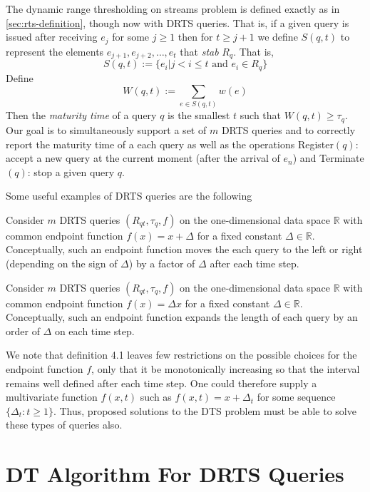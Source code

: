 The dynamic range thresholding on streams problem is defined exactly as in \cref{sec:rts-definition}, though now with DRTS queries. That is, if a given query is issued after receiving $e_j$ for some $j\geq 1$ then for $t\geq j+1$ we define $S(q,t)$ to represent the elements $e_{j+1},e_{j+2},\dots,e_t$ that \textit{stab} $R_q$. That is, 
$$S(q, t) := \{e_i | j < i \leq t \text{ and } e_i \in R_q\}$$
Define
$$W(q, t) := \sum_{e\in S(q,t)}w(e)$$
Then the \textit{maturity time} of a query $q$ is the smallest $t$ such that $W(q,t)\geq \tau_q$. Our goal is to simultaneously support a set of $m$ DRTS queries and to correctly report the maturity time of a each query as well as the operations Register$(q)$: accept a new query at the current moment (after the arrival of $e_n$) and Terminate$(q)$: stop a given query $q$.

Some useful examples of DRTS queries are the following

\begin{example} Consider $m$ DRTS queries $(R_{qt}, \tau_q, f)$ on the one-dimensional data space  $\mathbb{R}$ with common endpoint function $f(x) = x + \Delta$ for a fixed constant $\Delta\in\mathbb{R}$. Conceptually, such an endpoint function moves the each query to the left or right (depending on the sign of $\Delta$) by a factor of $\Delta$ after each time step.
\end{example}

\begin{example} Consider $m$ DRTS queries $(R_{qt}, \tau_q, f)$ on the one-dimensional data space  $\mathbb{R}$ with common endpoint function $f(x) = \Delta x$  for a fixed constant $\Delta\in\mathbb{R}$. Conceptually, such an endpoint function expands the length of each query by an order of $\Delta$ on each time step.
\end{example}
    
We note that definition 4.1 leaves few restrictions on the possible choices for the endpoint function $f$, only that it be monotonically increasing so that the interval remains well defined after each time step. One could therefore supply a multivariate function $f(x,t)$ such as $f(x, t) = x + \Delta_t$ for some sequence $\{\Delta_t: t\geq1\}$. Thus, proposed solutions to the DTS problem must be able to solve these types of queries also. 


\newpage
\section{DT Algorithm For DRTS Queries}
\label{sec:drts-dt-algorithm}

